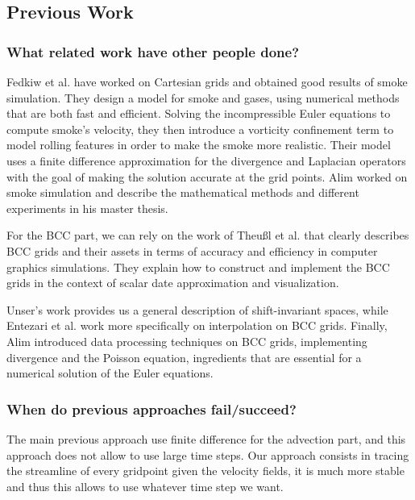 \documentclass[accepted,single]{gipaper}
\begin{document}
\subsection{Previous Work}

\subsubsection{What related work have other people done?}
Fedkiw et al. \cite{Fedkiw:2001} have worked on Cartesian grids and obtained good results of smoke simulation. They design a model for smoke and gases, using numerical methods that are both fast and efficient. Solving the incompressible Euler equations to compute smoke's velocity, they then introduce a vorticity confinement term to model rolling features in order to make the smoke more realistic. Their model uses a finite difference approximation for the divergence and Laplacian operators with the goal of making the solution accurate at the grid points.
Alim \cite{alim:ms} worked on smoke simulation and describe the mathematical methods and different experiments in his master thesis.

For the BCC part, we can rely on the work of Theußl et al. \cite{TheuBl:2001} that clearly describes BCC grids and their assets in terms of accuracy and efficiency in computer graphics simulations. They explain how to construct and implement the BCC grids in the context of scalar date approximation and visualization.

Unser's work \cite{Unser:2000} provides us a general description of shift-invariant spaces, while Entezari et al. \cite{Entezari:2008} work more specifically on interpolation on BCC grids.
Finally, Alim \cite{alim:phd} introduced data processing techniques on BCC grids, implementing divergence and the Poisson equation, ingredients that are essential for a numerical solution of the Euler equations.

\subsubsection{When do previous approaches fail/succeed?}

The main previous approach use finite difference for the advection part, and this approach does not allow to use large time steps. Our approach consists in tracing the streamline of every gridpoint given the velocity fields, it is much more stable and thus this allows to use whatever time step we want.
\end{document}
